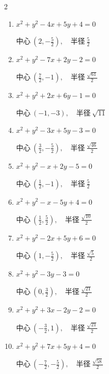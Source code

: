 \begin{multicols}{2}
\begin{enumerate}
        $\displaystyle 中心\: \left(3,\frac{1}{2}\right), \quad 半径 \ \frac{5}{2}$

  \item $x^{2}+y^{2}-4x+5y+4=0$

        $\displaystyle 中心\: \left(2,-\frac{5}{2}\right), \quad 半径 \ \frac{5}{2}$

\columnbreak %

\resetques

  \item $x^{2}+y^{2}-7x+2y-2=0$

        $\displaystyle 中心\: \left(\frac{7}{2},-1\right), \quad 半径 \ \frac{\sqrt{61}}{2}$

  \item $x^{2}+y^{2}+2x+6y-1=0$

        $\displaystyle 中心\: \left(-1,-3\right), \quad 半径 \ \sqrt{11}$

  \item $x^{2}+y^{2}-3x+5y-3=0$

        $\displaystyle 中心\: \left(\frac{3}{2},-\frac{5}{2}\right), \quad 半径 \ \frac{\sqrt{46}}{2}$

  \item $x^{2}+y^{2}-x+2y-5=0$

        $\displaystyle 中心\: \left(\frac{1}{2},-1\right), \quad 半径 \ \frac{5}{2}$

  \item $x^{2}+y^{2}-x-5y+4=0$

        $\displaystyle 中心\: \left(\frac{1}{2},\frac{5}{2}\right), \quad 半径 \ \frac{\sqrt{10}}{2}$

  \item $x^{2}+y^{2}-2x+5y+6=0$

        $\displaystyle 中心\: \left(1,-\frac{5}{2}\right), \quad 半径 \ \frac{\sqrt{5}}{2}$

  \item $x^{2}+y^{2}-3y-3=0$

        $\displaystyle 中心\: \left(0,\frac{3}{2}\right), \quad 半径 \ \frac{\sqrt{21}}{2}$

  \item $x^{2}+y^{2}+3x-2y-2=0$

        $\displaystyle 中心\: \left(-\frac{3}{2},1\right), \quad 半径 \ \frac{\sqrt{21}}{2}$

  \item $x^{2}+y^{2}+7x+5y+4=0$

        $\displaystyle 中心\: \left(-\frac{7}{2},-\frac{5}{2}\right), \quad 半径 \ \frac{\sqrt{58}}{2}$


\end{enumerate}
\end{multicols}
